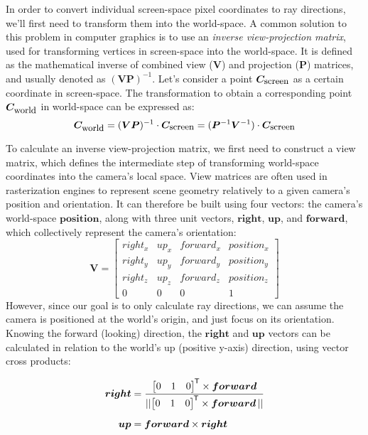 In order to convert individual screen-space pixel coordinates to ray directions, we'll first need to transform them into the world-space.
A common solution to this problem in computer graphics is to use an \textit{inverse view-projection matrix}, used for transforming vertices in screen-space into the world-space.
It is defined as the mathematical inverse of combined view ($ \bm{V} $) and projection ($ \bm{P} $) matrices, and usually denoted as $ (\bm{VP})^{-1} $.
Let's consider a point $ \bm{C}_{\textnormal{\small screen}} $ as a certain coordinate in screen-space.
The transformation to obtain a corresponding point $ \bm{C}_{\textnormal{\small world}} $ in world-space can be expressed as:
%
\begin{equation}
    \bm{C}_{\textnormal{\small world}} = (\bm{VP})^{-1} \cdot \bm{C}_{\textnormal{\small screen}} = (\bm{P}^{-1} \bm{V}^{-1}) \cdot \bm{C}_{\textnormal{\small screen}}
\end{equation}

To calculate an inverse view-projection matrix, we first need to construct a view matrix, which defines the intermediate step of transforming world-space coordinates into the camera's local space.
View matrices are often used in rasterization engines to represent scene geometry relatively to a given camera's position and orientation.
It can therefore be built using four vectors: the camera's world-space $ \bm{position} $, along with three unit vectors, $ \bm{right} $, $ \bm{up} $, and $ \bm{forward} $, which collectively represent the camera's orientation:
%
\begin{equation}
    \bm{V} =
    \begin{bmatrix}
        right_x & up_x & forward_x & position_x\\
        right_y & up_y & forward_y & position_y\\
        right_z & up_z & forward_z & position_z\\
        0       & 0    & 0         & 1
    \end{bmatrix}
    \label{eq:Implementation/RayGeneration/view_matrix}
\end{equation}
%
However, since our goal is to only calculate ray directions, we can assume the camera is positioned at the world's origin, and just focus on its orientation.
Knowing the forward (looking) direction, the $ \bm{right} $ and $ \bm{up} $ vectors can be calculated in relation to the world's up (positive y-axis) direction, using vector cross products:  
%
{
    \newcommand*{\worldup}{\begin{bmatrix} 0 & 1 & 0 \end{bmatrix}\tran}
    \begin{align}
        \bm{right} &= \frac{\worldup\times \bm{forward}}{\norm{\worldup\times \bm{forward}\,}}\\[0.5em]
        \bm{up}    &= \bm{forward} \times \bm{right}
    \end{align}
    
}

